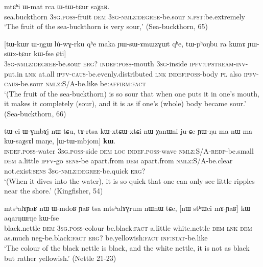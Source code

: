 \documentclass[oldfontcommands,oneside,a4paper,11pt]{article}
\newcommand{\ipa}[1]{{\phon #1}} %
\begin{document}
\begin{exe}
\ex \label{ex:YWsWxtCur}
\gll 
\ipa{mtɕʰi}  	\ipa{ɯ-mat}  	\ipa{rca}  	\ipa{ɯ-tɯ-tɕur}  	\ipa{saχaʁ.}  	   \\
sea.buckthorn \textsc{3sg.poss}-fruit \textsc{dem} \textsc{3sg-nmlz:degree}-be.sour \textsc{n.pst}:be.extremely   \\
\glt `The fruit of the sea-buckthorn is very sour,' (Sea-buckthorn, 65)
\end{exe}

\begin{exe}
\ex \label{ex:YWsWxtCur2}
\gll 
 	[\ipa{ɯ-tɯ-tɕur}]  	\ipa{\textbf{kɯ}}  	[\ipa{tɯ-kɯr}  	\ipa{ɯ-ŋgɯ}  	\ipa{lú-wɣ-rku}  	\ipa{qʰe}  	\ipa{maka}  	\ipa{ɲɯ-sɯ-ɤmɯzɣɯt}  	\ipa{qʰe,}  	\ipa{tɯ-pʰoŋbu}  	\ipa{ra}  	\ipa{kɯnɤ}  	\ipa{ɲɯ-sɯx-tɕur}  	\ipa{kɯ-fse}  	\ipa{ɕti}]  \\
  \textsc{3sg-nmlz:degree}-be.sour \textsc{erg?} \textsc{indef:poss}-mouth \textsc{3sg}-inside \textsc{ipfv:upstream-inv}-put.in \textsc{lnk} at.all \textsc{ipfv-caus}-be.evenly.distributed \textsc{lnk} \textsc{indef:poss}-body \textsc{pl} also \textsc{ipfv-caus}-be.sour \textsc{nmlz:S/A}-be.like be:\textsc{affirm}:\textsc{fact} \\
\glt `(The fruit of the sea-buckthorn) is so sour that when one puts it in one's mouth, it makes it completely (sour), and it is as if one's (whole) body became sour.' (Sea-buckthorn, 66)
\end{exe}

 \begin{exe}
\ex \label{ex:WtWmbjom}
\gll 
\ipa{tɯ-ci}  	\ipa{ɯ-ɣmbɤj}  	\ipa{nɯ}  	\ipa{tɕu,}  	  	\ipa{tɤ-rtsa}  	\ipa{kɯ-xtɕɯ-xtɕi}  	\ipa{nɯ}  	\ipa{χanɯni}  	\ipa{ju-ɕe}  	\ipa{ɲɯ-ŋu}  	\ipa{ma}  	\ipa{nɯ}  	\ipa{ma}  	\ipa{kɯ-saχsɤl}  	\ipa{maŋe,}  	[\ipa{ɯ-tɯ-mbjom}]  	\ipa{\textbf{kɯ}.}  \\
\textsc{indef.poss}-water \textsc{3sg.poss}-side \textsc{dem} \textsc{loc} \textsc{indef.poss}-wave \textsc{nmlz:S/A-redp}-be.small \textsc{dem} a.little \textsc{ipfv}-go \textsc{sens}-be apart.from \textsc{dem} apart.from   \textsc{nmlz:S/A}-be.clear not.exist:\textsc{sens} \textsc{3sg-nmlz:degree}-be.quick \textsc{erg?} \\
\glt `(When it dives into the water), it is so quick that one can only see little ripples near the shore.'
 (Kingfisher, 54)
\end{exe}

\begin{exe}
  \ex  \label{ex:mAYaR.kW}  
  \gll 
  \ipa{mtsʰalɤɲaʁ} 	\ipa{nɯ} 	\ipa{ɯ-mdoʁ} 	\ipa{ɲaʁ} 	\ipa{tsa} 	\ipa{mtsʰalɤɣrum} 	\ipa{nɯnɯ} 	\ipa{tɕe,} 	[\ipa{nɯ} \ipa{stʰɯci} 	\ipa{mɤ-ɲaʁ}] 	\ipa{kɯ}   	\ipa{aqarŋɯrŋe} 	\ipa{kɯ-fse} 	\\
  black.nettle \textsc{dem} \textsc{3sg.poss}-colour be.black:\textsc{fact} a.little   white.nettle \textsc{dem} \textsc{lnk} \textsc{dem} as.much neg-be.black:\textsc{fact}  \textsc{erg?} be.yellowish:\textsc{fact} \textsc{inf:stat}-be.like \\
  \glt `The colour of the black nettle is black, and the white nettle, it is not as  black but rather yellowish.'   (Nettle 21-23)
        \end{exe} 
        
\end{document}
